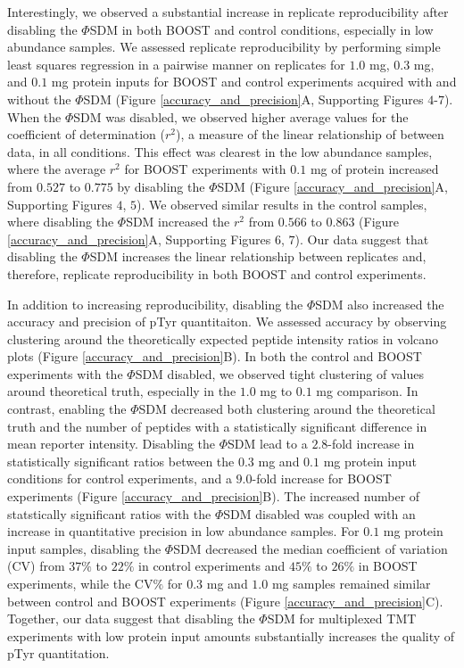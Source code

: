 \documentclass[journal=jprobs,manuscript=article]{achemso}
\begin{document}
Interestingly, we observed a substantial increase in replicate reproducibility after disabling the $\Phi$SDM in both BOOST and control conditions, especially in low abundance samples. We assessed replicate reproducibility by performing simple least squares regression in a pairwise manner on replicates for $1.0$ mg, $0.3$ mg, and $0.1$ mg protein inputs for BOOST and control experiments acquired with and without the $\Phi$SDM (Figure \ref{accuracy_and_precision}A, Supporting Figures $4$-$7$). When the $\Phi$SDM was disabled, we observed higher average values for the coefficient of determination ($r^{2}$), a measure of the linear relationship of between data, in all conditions. This effect was clearest in the low abundance samples, where the average $r^{2}$ for BOOST experiments with $0.1$ mg of protein increased from $0.527$ to $0.775$ by disabling the $\Phi$SDM (Figure \ref{accuracy_and_precision}A, Supporting Figures $4$, $5$). We observed similar results in the control samples, where disabling the $\Phi$SDM increased the $r^{2}$ from $0.566$ to $0.863$ (Figure \ref{accuracy_and_precision}A, Supporting Figures $6$, $7$). Our data suggest that disabling the $\Phi$SDM increases the linear relationship between replicates and, therefore, replicate reproducibility in both BOOST and control experiments.

In addition to increasing reproducibility, disabling the $\Phi$SDM also increased the accuracy and precision of pTyr quantitaiton. We assessed accuracy by observing clustering around the theoretically expected peptide intensity ratios in volcano plots (Figure \ref{accuracy_and_precision}B). In both the control and BOOST experiments with the $\Phi$SDM disabled, we observed tight clustering of values around theoretical truth, especially in the $1.0$ mg to $0.1$ mg comparison. In contrast, enabling the $\Phi$SDM decreased both clustering around the theoretical truth and the number of peptides with a statistically significant difference in mean reporter intensity. Disabling the $\Phi$SDM lead to a $2.8$-fold increase in statistically significant ratios between the $0.3$ mg and $0.1$ mg protein input conditions for control experiments, and a $9.0$-fold increase for BOOST experiments (Figure \ref{accuracy_and_precision}B). The increased number of statstically significant ratios with the $\Phi$SDM disabled was coupled with an increase in quantitative precision in low abundance samples. For $0.1$ mg protein input samples, disabling the $\Phi$SDM decreased the median coefficient of variation (CV) from $37\%$ to $22\%$ in control experiments and $45\%$ to $26\%$ in BOOST experiments, while the CV$\%$ for $0.3$ mg and $1.0$ mg samples remained similar between control and BOOST experiments (Figure \ref{accuracy_and_precision}C). Together, our data suggest that disabling the $\Phi$SDM for multiplexed TMT experiments with low protein input amounts substantially increases the quality of pTyr quantitation.
\end{document}
